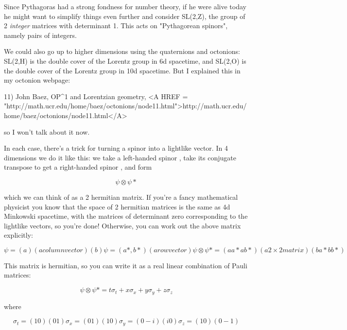 Since Pythagoras had a strong fondness for number theory, if he 
were alive today he might want to simplify things even further 
and consider SL(2,Z), the group of 2 \emph{integer} matrices with 
determinant 1.  This acts on "Pythagorean spinors", namely pairs 
of integers.

We could also go up to higher dimensions using the quaternions
and octonions: SL(2,H) is the double cover of the Lorentz
group in 6d spacetime, and SL(2,O) is the double cover of the
Lorentz group in 10d spacetime.  But I explained this in my
octonion webpage:

11) John Baez, OP^{1} and Lorentzian geometry, 
<A HREF = "http://math.ucr.edu/home/baez/octonions/node11.html">http://math.ucr.edu/home/baez/octonions/node11.html</A>

so I won't talk about it now.

In each case, there's a trick for turning a spinor into a 
lightlike vector.  In 4 dimensions we do it like this: we 
take a left-handed spinor \psi , take its conjugate transpose 
to get a right-handed spinor \psi *, and form 

$$
\psi  \otimes  \psi *
$$
    
which we can think of as a 2 hermitian matrix.   If you're
a fancy mathematical physicist you know that the space of 
2 hermitian matrices is the same as 4d Minkowski spacetime, 
with the matrices of determinant zero corresponding to the 
lightlike vectors, so you're done!  Otherwise, you can work 
out the above matrix explicitly:

$$
\psi  = (a)                                         (a column vector)
    (b)

\psi  = (a*, b*)                                    (a row vector)


\psi  \otimes  \psi * = (aa* ab*)                              (a 2\times 2 matrix)
         (ba* bb*)                  
$$
    
This matrix is hermitian, so you can write it as a real 
linear combination of Pauli matrices:

$$
\psi  \otimes  \psi * = t \sigma _{t} + x \sigma _{x} + y \sigma _{y} + z \sigma _{z}
$$
    
where

$$
\sigma _{t} = (1  0)
     (0  1)

\sigma _{x} = (0  1)
     (1  0)

\sigma _{y} = (0 -i)
     (i  0)

\sigma _{z} = (1  0)
     (0 -1)
$$
    
